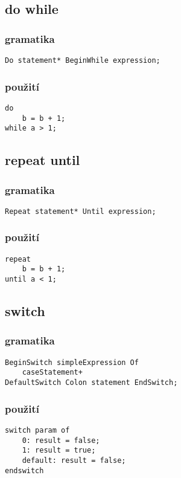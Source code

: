 \documentclass{style}
\begin{document}
\subsection{do while}
\subsubsection{gramatika}
\begin{lstlisting}
Do statement* BeginWhile expression;
\end{lstlisting}

\subsubsection{použití}
\begin{lstlisting}
do 
	b = b + 1;
while a > 1;
\end{lstlisting}

\subsection{repeat until}
\subsubsection{gramatika}
\begin{lstlisting}
Repeat statement* Until expression;
\end{lstlisting}

\subsubsection{použití}
\begin{lstlisting}
repeat
	b = b + 1;
until a < 1;
\end{lstlisting}

\subsection{switch}
\subsubsection{gramatika}
\begin{lstlisting}
BeginSwitch simpleExpression Of 
	caseStatement+ 
DefaultSwitch Colon statement EndSwitch;
\end{lstlisting}

\subsubsection{použití}
\begin{lstlisting}
switch param of
    0: result = false;
    1: result = true;
    default: result = false;
endswitch
\end{lstlisting}
\end{document}
